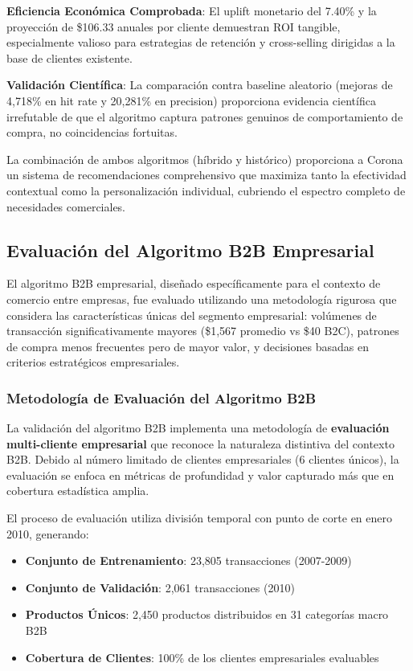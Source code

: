 \documentclass[twocolumn]{article}
\begin{document}
\textbf{Eficiencia Económica Comprobada}: El uplift monetario del 7.40\% y la proyección de \$106.33 anuales por cliente demuestran ROI tangible, especialmente valioso para estrategias de retención y cross-selling dirigidas a la base de clientes existente.

\textbf{Validación Científica}: La comparación contra baseline aleatorio (mejoras de 4,718\% en hit rate y 20,281\% en precision) proporciona evidencia científica irrefutable de que el algoritmo captura patrones genuinos de comportamiento de compra, no coincidencias fortuitas.

La combinación de ambos algoritmos (híbrido y histórico) proporciona a Corona un sistema de recomendaciones comprehensivo que maximiza tanto la efectividad contextual como la personalización individual, cubriendo el espectro completo de necesidades comerciales.

\subsection{Evaluación del Algoritmo B2B Empresarial}

El algoritmo B2B empresarial, diseñado específicamente para el contexto de comercio entre empresas, fue evaluado utilizando una metodología rigurosa que considera las características únicas del segmento empresarial: volúmenes de transacción significativamente mayores (\$1,567 promedio vs \$40 B2C), patrones de compra menos frecuentes pero de mayor valor, y decisiones basadas en criterios estratégicos empresariales.

\subsubsection{Metodología de Evaluación del Algoritmo B2B}

La validación del algoritmo B2B implementa una metodología de \textbf{evaluación multi-cliente empresarial} que reconoce la naturaleza distintiva del contexto B2B. Debido al número limitado de clientes empresariales (6 clientes únicos), la evaluación se enfoca en métricas de profundidad y valor capturado más que en cobertura estadística amplia.

El proceso de evaluación utiliza división temporal con punto de corte en enero 2010, generando:
\begin{itemize}
    \item \textbf{Conjunto de Entrenamiento}: 23,805 transacciones (2007-2009) 
    \item \textbf{Conjunto de Validación}: 2,061 transacciones (2010)
    \item \textbf{Productos Únicos}: 2,450 productos distribuidos en 31 categorías macro B2B
    \item \textbf{Cobertura de Clientes}: 100\% de los clientes empresariales evaluables
\end{itemize}
\end{document}
